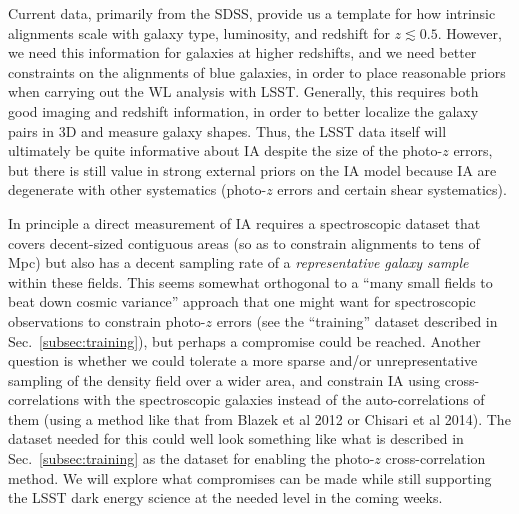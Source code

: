 Current data, primarily from the SDSS, provide us a template for how intrinsic alignments scale with
galaxy type, luminosity, and redshift for $z\lesssim 0.5$.  However, we need this information for
galaxies at higher redshifts, and we need better constraints on the alignments of blue galaxies, in
order to place reasonable priors when carrying out the WL analysis with LSST. Generally, this
requires both good imaging and redshift information, in order to better localize the galaxy pairs in
3D and measure galaxy shapes.  Thus, the LSST data itself will ultimately be quite informative about
IA despite the size of the photo-$z$ errors, but there is still value in strong external priors on
the IA model because IA are degenerate with other systematics (photo-$z$ errors and certain shear
systematics).

In principle a direct measurement of IA requires a spectroscopic dataset that covers decent-sized
contiguous areas (so as to constrain alignments to tens of Mpc) but also has a decent sampling rate
of a {\em representative galaxy sample} within these fields.  This seems somewhat orthogonal to a
``many small fields to beat down cosmic variance'' approach that one might want for spectroscopic
observations to constrain photo-$z$ errors (see the ``training'' dataset described in
Sec.~\ref{subsec:training}), but perhaps a compromise could be reached.  Another question is whether
we could tolerate a more sparse and/or unrepresentative sampling of the density field over a wider
area, and constrain IA using cross-correlations with the spectroscopic galaxies instead of the
auto-correlations of them (using a method like that from Blazek et al 2012 or Chisari et al 2014).
The dataset needed for this could well look something like what is described in
Sec.~\ref{subsec:training} as the dataset for enabling the photo-$z$ cross-correlation method. We
will explore what compromises can be made while still supporting the LSST dark energy science at the
needed level in the coming weeks.
